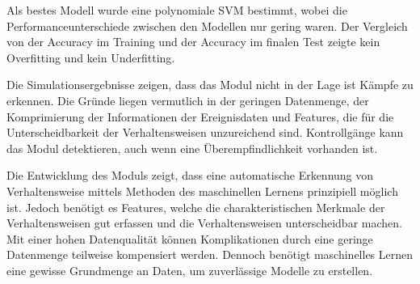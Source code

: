 Als bestes Modell wurde eine polynomiale SVM bestimmt, wobei die Performanceunterschiede zwischen den Modellen nur gering waren. Der Vergleich von der Accuracy im Training und der Accuracy im finalen Test zeigte kein Overfitting und kein Underfitting.\par

Die Simulationsergebnisse zeigen, dass das Modul nicht in der Lage ist Kämpfe zu erkennen. Die Gründe liegen vermutlich in der geringen Datenmenge, der Komprimierung der Informationen der Ereignisdaten und Features, die für die Unterscheidbarkeit der Verhaltensweisen unzureichend sind. Kontrollgänge kann das Modul detektieren, auch wenn eine Überempfindlichkeit vorhanden ist. \par

Die Entwicklung des Moduls zeigt, dass eine automatische Erkennung von Verhaltensweise mittels Methoden des maschinellen Lernens prinzipiell möglich ist. Jedoch benötigt es Features, welche die charakteristischen Merkmale der Verhaltensweisen gut erfassen und die Verhaltensweisen unterscheidbar machen. Mit einer hohen Datenqualität können Komplikationen durch eine geringe Datenmenge teilweise kompensiert werden. Dennoch benötigt maschinelles Lernen eine gewisse Grundmenge an Daten, um zuverlässige Modelle zu erstellen. 